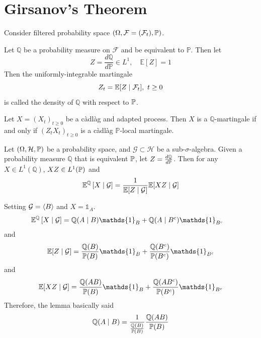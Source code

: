\documentclass[a4paper,12pt]{article}
\begin{document}
\section{Girsanov's Theorem}

Consider filtered probability space $(\Omega, \mathcal{F}=(\mathcal{F}_t), \mathbb{P})$.
\begin{defn}
  Let $\mathbb{Q}$ be a probability measure on $\mathcal{F}$ and be equivalent to $\mathbb{P}$. Then let
  \begin{equation*}
    Z = \frac{d\mathbb{Q}}{d\mathbb{P}} \in L^1,\quad\mathbb{E}[Z] = 1
  \end{equation*}
  Then the uniformly-integrable martingale
  \begin{equation*}
    Z_t = \mathbb{E}[Z \mid \mathcal{F}_t],~t \geq 0
  \end{equation*}
  is called the density of $\mathbb{Q}$ with respect to $\mathbb{P}$.
\end{defn}

\begin{prop}
  Let $X=(X_t)_{t \geq 0}$ be a c\`adl\`ag and adapted process. Then $X$ is a $\mathbb{Q}$-martingale if and only if $(Z_tX_t)_{t \geq 0}$ is a c\`adl\`ag $\mathbb{P}$-local martingale.
\end{prop}

\begin{lem}
  Let $(\Omega, \mathcal{H},\mathbb{P})$ be a probability space, and $\mathcal{G} \subset \mathcal{H}$ be a sub-$\sigma$-algebra. Given a probability measure $\mathbb{Q}$ that is equivalent $\mathbb{P}$, let $Z = \frac{d \mathbb{Q}}{d \mathbb{P}}$. Then for any $X \in L^1(\mathbb{Q})$, $XZ \in L^1(\mathbb{P})$ and 
  \begin{equation*}
    \mathbb{E}^{\mathbb{Q}}\left[X \mid \mathcal{G}\right] = \frac{1}{\mathbb{E}[Z \mid \mathcal{G}]}\mathbb{E}[XZ \mid \mathcal{G}]
  \end{equation*}
\end{lem}
\begin{exam}
  Setting $\mathcal{G} = \left\langle B \right\rangle$ and $X = \mathds{1}_A$.
  \begin{equation*}
    \begin{aligned}
      \E^{\mathbb{Q}}\bj{X \mid \mathcal{G}} &= \mathbb{Q}(A \mid B)\mathds{1}_B + \mathbb{Q}(A \mid B^c)\mathds{1}_{B^c}
    \end{aligned}
  \end{equation*}
  and
  \begin{equation*}
    \E[Z \mid \mathcal{G}] = \frac{\mathbb{Q}(B)}{\Pb(B)}\mathds{1}_B + \frac{\mathbb{Q}(B^c)}{\Pb(B^c)}\mathds{1}_{B^c}
  \end{equation*}
  and
  \begin{equation*}
    \E[XZ \mid \mathcal{G}] = \frac{\mathbb{Q}(AB)}{\Pb(B)}\mathds{1}_B + \frac{\mathbb{Q}(AB^c)}{\Pb(B^c)}\mathds{1}_{B^c}
  \end{equation*}
  Therefore, the lemma basically said
  \begin{equation*}
    \mathbb{Q}(A \mid B) = \frac{1}{\frac{\mathbb{Q}(B)}{\mathbb{P}(B)}}\frac{\mathbb{Q}(AB)}{\mathbb{P}(B)}
  \end{equation*}
\end{exam}
\end{document}
